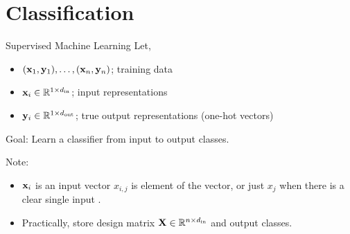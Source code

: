 \documentclass{beamer}
\begin{document}





\section{Classification}


\begin{frame}{Supervised Machine Learning}
  Let, 
  \begin{itemize}
  \item $(\mathbf{x}_1, \mathbf{y}_1), \ldots, (\mathbf{x}_n, \mathbf{y}_n)$; training data
  \item $\mathbf{x}_i \in \mathbb{R}^{1 \times {d_{\mathrm{in}}}}$;  input representations  
  \item $\mathbf{y}_i \in \mathbb{R}^{1 \times {d_{\mathrm{out}}}}$; true output representations (one-hot vectors)
  \end{itemize}

  Goal: Learn a classifier from input to output classes.  

  \air
  \air

  Note:
  \begin{itemize}
  \item $\mathbf{x}_i$ is an input vector $x_{i, j}$ is element of the vector, or just $x_j$ when there is a clear single input .
  \item Practically, store design matrix $\mathbf{X} \in \mathbb{R}^{n    \times {d_{\mathrm{in}}}}$ and output classes.
  \end{itemize}


\end{frame}
\end{document}
